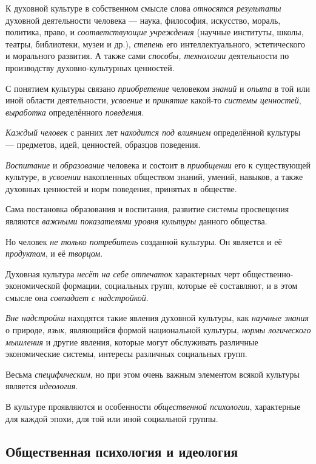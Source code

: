 \documentclass[a4paper,14pt,russian]{extreport}
\begin{document}
К духовной культуре в собственном смысле слова \emph{относятся результаты} духовной деятельности человека --- наука, философия, искусство, мораль, политика, право, и \emph{соответствующие учреждения} (научные институты, школы, театры, библиотеки, музеи и др.), \emph{степень} его интеллектуального, эстетического и морального развития. А также сами \emph{способы, технологии} деятельности по производству духовно-культурных ценностей.

С понятием культуры связано \emph{приобретение} человеком \emph{знаний} и \emph{опыта} в той или иной области деятельности, \emph{усвоение} и \emph{принятие} какой-то \emph{системы ценностей}, \emph{выработка} определённого \emph{поведения}.

\emph{Каждый человек} с ранних лет \emph{находится под влиянием} определённой культуры --- предметов, идей, ценностей, образцов поведения.

\emph{Воспитание} и \emph{образование} человека и состоит в \emph{приобщении} его к существующей культуре, в \emph{усвоении} накопленных обществом знаний, умений, навыков, а также духовных ценностей и норм поведения, принятых в обществе.

Сама постановка образования и воспитания, развитие системы просвещения являются \emph{важными показателями уровня культуры} данного общества.

Но человек \emph{не только потребитель} созданной культуры. Он является и её \emph{продуктом}, и её \emph{творцом}.

Духовная культура \emph{несёт на себе} \emph{отпечаток} характерных черт общественно-экономической формации, социальных групп, которые её составляют, и в этом смысле она \emph{совпадает с надстройкой}.

\emph{Вне надстройки} находятся такие явления духовной культуры, как \emph{научные знания} о природе, \emph{язык}, являющийся формой национальной культуры, \emph{нормы логического мышления} и другие явления, которые могут обслуживать различные экономические системы, интересы различных социальных групп.

Весьма \emph{специфическим}, но при этом очень важным элементом всякой культуры является \emph{идеология}.

В культуре проявляются и особенности \emph{общественной психологии}, характерные для каждой эпохи, для той или иной социальной группы.

\subsection{Общественная психология и идеология}
\end{document}
